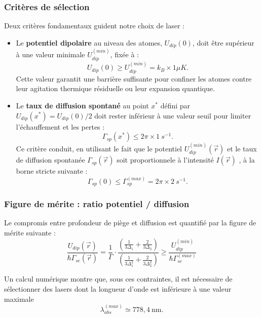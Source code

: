 \subsubsection*{Critères de sélection}

Deux critères fondamentaux guident notre choix de laser :
\begin{itemize}
	\item Le {\bf potentiel dipolaire} au niveau des atomes, $U_{dip}(0)$, doit être supérieur à une valeur minimale $U_{dip}^{(min)}$, fixée à :
		\[
			U_{dip}(0)  \geq U_{dip}^{(min)} = k_B \times 1 \mu K.
		\]
		Cette valeur garantit une barrière suffisante pour confiner les atomes contre leur agitation thermique résiduelle ou leur expansion quantique.
	\item Le {\bf taux de diffusion spontané}  au point $x^\ast$ défini par $U_{dip}(x^\ast) = U_{dip}(0)/2$ doit rester inférieur à une valeur seuil pour limiter l’échauffement et les pertes :
		\[
			\Gamma_{sp}(x^\ast) \leq 2\pi \times 1~s^{-1}.
		\]
		Ce critère conduit, en utilisant le fait que le potentiel $U_{dip}^{(min)}(\vec{r})$ et le taux de diffusion spontanée $\Gamma_{sp}(\vec{r})$ soit proportionnele à l’intensité $I(\vec{r})$ , à la borne stricte suivante :
		\[
			\Gamma_{sp}(0) \leq \Gamma_{sp}^{(max)} = 2\pi \times 2~s^{-1}.
		\]
\end{itemize}

\subsubsection*{Figure de mérite : ratio potentiel / diffusion}

Le compromis entre profondeur de piège et diffusion est quantifié par la figure de mérite suivante :
\begin{equation}
\frac{U_{dip}(\vec{r})}{\hbar \Gamma_{sc}(\vec{r})} = \frac{1}{\Gamma} \cdot \frac{ \left( \frac{1}{3\Delta_1} + \frac{2}{3\Delta_2} \right)}{\left( \frac{1}{3\Delta_1^2} + \frac{2}{3\Delta_2^2} \right)} \geq \frac{U_{dip}^{(min)}}{\hbar \Gamma_{sc}^{(max)}}
\end{equation}

Un calcul numérique montre que, sous ces contraintes, il est nécessaire de sélectionner des lasers dont la longueur d’onde est inférieure à une valeur maximale 
\[
\lambda^{(max)}_{abs} \simeq  778{,}4~\text{nm}.
\]


